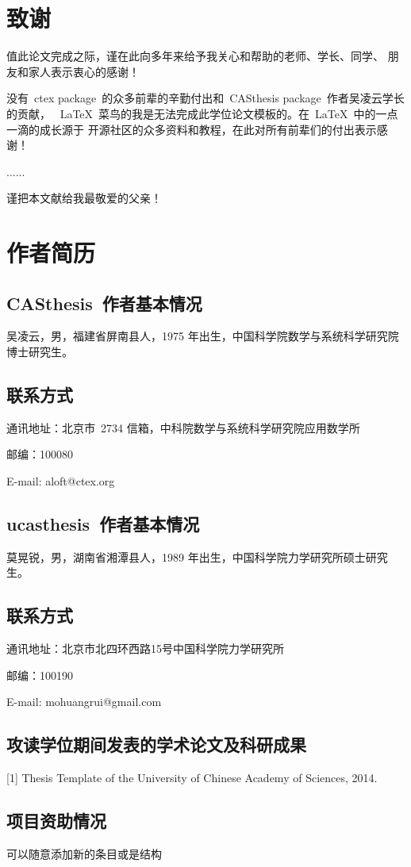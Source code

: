 \chapter{致\quad 谢}

值此论文完成之际，谨在此向多年来给予我关心和帮助的老师、学长、同学、
朋友和家人表示衷心的感谢！

没有~ctex package~的众多前辈的辛勤付出和~CASthesis package~作者吴凌云学长的贡献，
~\LaTeX{}~菜鸟的我是无法完成此学位论文模板的。在~\LaTeX{}~中的一点一滴的成长源于
开源社区的众多资料和教程，在此对所有前辈们的付出表示感谢！

......

谨把本文献给我最敬爱的父亲！

\chapter{作者简历}

\section*{CASthesis~作者基本情况}

吴凌云，男，福建省屏南县人，1975 年出生，中国科学院数学与系统科学研究院博士研究生。

\section*{联系方式}

通讯地址：北京市~2734 信箱，中科院数学与系统科学研究院应用数学所

邮编：100080

E-mail: aloft@ctex.org

\section*{ucasthesis~作者基本情况}

莫晃锐，男，湖南省湘潭县人，1989 年出生，中国科学院力学研究所硕士研究生。

\section*{联系方式}

通讯地址：北京市北四环西路15号中国科学院力学研究所

邮编：100190

E-mail: mohuangrui@gmail.com

\section*{攻读学位期间发表的学术论文及科研成果}

[1] Thesis Template of the University of Chinese Academy of Sciences, 2014.

\section*{项目资助情况}

可以随意添加新的条目或是结构
